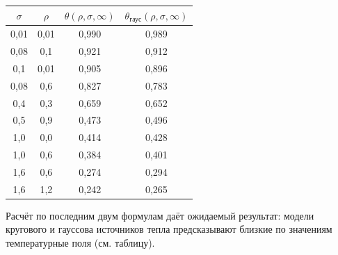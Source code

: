 \begin{table}

\small \centering \vspace{-2mm}

\begin{tabular}{c|c|c|c}

\hline 

\footnotesize $ \sigma $ & 

\footnotesize $ \rho $ & 

\footnotesize $ \theta (\rho,\sigma,\infty)$ & 

\footnotesize $ \theta_{\text {гаус}}(\rho,\sigma,\infty)$ \\  \hline

\rule{0mm}{12pt}%

0,01& 0,01 & 0,990 & 0,989  \\ 

0,08& 0,1 & 0,921 & 0,912 \\ 

0,1& 0,01 & 0,905 & 0,896 \\ 

0,08& 0,6 & 0,827 & 0,783 \\ 

0,4& 0,3 & 0,659 & 0,652 \\ 

0,5& 0,9 & 0,473 & 0,496 \\ 

1,0& 0,0 & 0,414 & 0,428 \\ 

1,0& 0,6 & 0,384 & 0,401 \\ 

1,6& 0,6 & 0,274 & 0,294 \\ 

1,6& 1,2 & 0,242 & 0,265 \\ \hline

\end{tabular}



\end{table}



\noindent 

Расчёт по последним двум формулам даёт ожидаемый результат: модели кругового и гауссова источников тепла предсказывают близкие по значениям температурные поля (см. таблицу).







